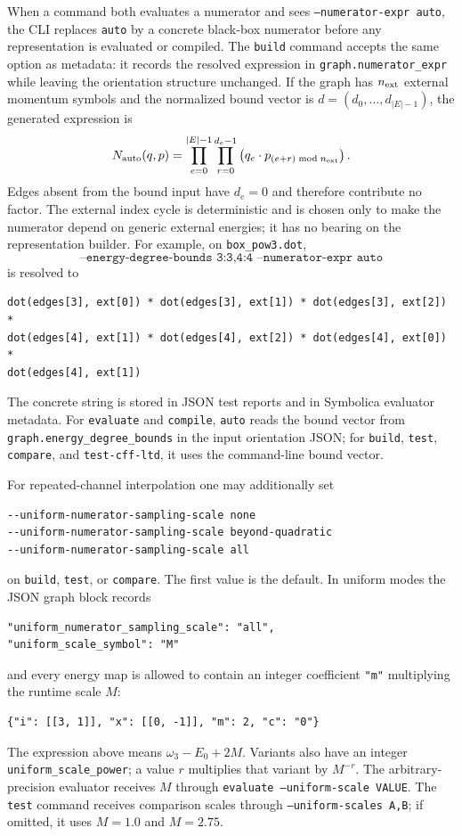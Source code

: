 \documentclass[11pt,a4paper]{report}
\begin{document}
When a command both evaluates a numerator and sees
\texttt{--numerator-expr auto}, the CLI replaces \texttt{auto} by a concrete
black-box numerator before any representation is evaluated or compiled.  The
\texttt{build} command accepts the same option as metadata: it records the
resolved expression in \texttt{graph.numerator\_expr} while leaving the
orientation structure unchanged.  If the graph has \(n_{\rm ext}\) external
momentum symbols and the normalized bound vector is
\(d=(d_0,\ldots,d_{|E|-1})\), the generated expression is
\begin{equation}
  N_{\rm auto}(q,p)
  =
  \prod_{e=0}^{|E|-1}
  \prod_{r=0}^{d_e-1}
  \left(q_e\cdot p_{(e+r)\bmod n_{\rm ext}}\right).
  \label{eq:auto-numerator}
\end{equation}
Edges absent from the bound input have \(d_e=0\) and therefore contribute no
factor.  The external index cycle is deterministic and is chosen only to make
the numerator depend on generic external energies; it has no bearing on the
representation builder.  For example, on \texttt{box\_pow3.dot},
\[
  \texttt{--energy-degree-bounds 3:3,4:4 --numerator-expr auto}
\]
is resolved to
\begin{lstlisting}
dot(edges[3], ext[0]) * dot(edges[3], ext[1]) * dot(edges[3], ext[2]) *
dot(edges[4], ext[1]) * dot(edges[4], ext[2]) * dot(edges[4], ext[0]) *
dot(edges[4], ext[1])
\end{lstlisting}
The concrete string is stored in JSON test reports and in Symbolica evaluator
metadata.  For \texttt{evaluate} and \texttt{compile}, \texttt{auto} reads the
bound vector from \texttt{graph.energy\_degree\_bounds} in the input
orientation JSON; for \texttt{build}, \texttt{test}, \texttt{compare}, and
\texttt{test-cff-ltd}, it uses the command-line bound vector.

For repeated-channel interpolation one may additionally set
\begin{lstlisting}
--uniform-numerator-sampling-scale none
--uniform-numerator-sampling-scale beyond-quadratic
--uniform-numerator-sampling-scale all
\end{lstlisting}
on \texttt{build}, \texttt{test}, or \texttt{compare}.  The first value is the
default.  In uniform modes the JSON graph block records
\begin{lstlisting}
"uniform_numerator_sampling_scale": "all",
"uniform_scale_symbol": "M"
\end{lstlisting}
and every energy map is allowed to contain an integer coefficient
\texttt{"m"} multiplying the runtime scale \(M\):
\begin{lstlisting}
{"i": [[3, 1]], "x": [[0, -1]], "m": 2, "c": "0"}
\end{lstlisting}
The expression above means \(\omega_3-E_0+2M\).  Variants also have an integer
\texttt{uniform\_scale\_power}; a value \(r\) multiplies that variant by
\(M^{-r}\).  The arbitrary-precision evaluator receives \(M\) through
\texttt{evaluate --uniform-scale VALUE}.  The \texttt{test} command receives
comparison scales through \texttt{--uniform-scales A,B}; if omitted, it uses
\(M=1.0\) and \(M=2.75\).
\end{document}
